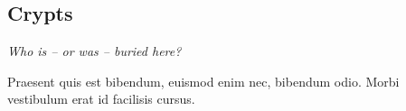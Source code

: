 \subsection{Crypts}
\textit{Who is -- or was -- buried here?}

\begin{quotebox}
Praesent quis est bibendum, euismod enim nec, bibendum odio. Morbi vestibulum erat id facilisis cursus.
\end{quotebox}
